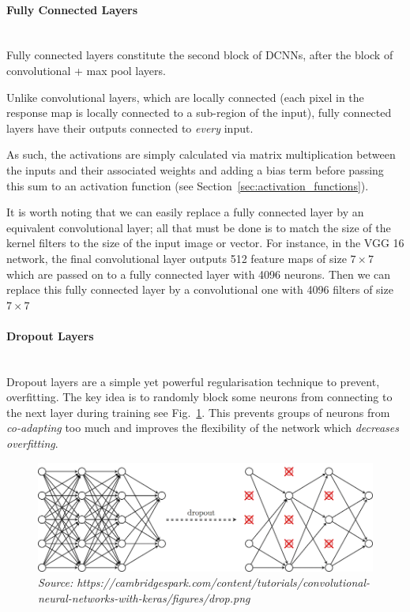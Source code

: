 \documentclass[12pt,twoside]{article}
\newcommand{\source}[1]{\vspace{-3pt} \caption*{ \footnotesize{\textit{Source: {#1}}}} }
\newcommand{\para}[1]{\paragraph{#1}\mbox{}\\}
\begin{document}
\para{Fully Connected Layers}

Fully connected layers constitute the second block of DCNNs, after the block of
convolutional + max pool layers.

Unlike convolutional layers, which are locally connected (each pixel in the
response map is locally connected to a sub-region of the input), fully
connected layers have their outputs connected to \textit{every} input.

As such, the activations are simply calculated via matrix multiplication
between the inputs and their associated weights and adding a bias term before
passing this sum to an activation function (see Section~\ref{sec:activation_functions}).

It is worth noting that we can easily replace a fully connected layer by an
equivalent convolutional layer; all that must be done is to match the size of
the kernel filters to the size of the input image or vector. For instance, in
the VGG 16 \cite{RefWorks:22} network, the final convolutional layer outputs 512 feature maps of
size $7 \times 7$ which are passed on to a fully connected layer with 4096
neurons. Then we can replace this fully connected layer by a convolutional one
with 4096 filters of size $7 \times 7$

\para{Dropout Layers}

Dropout layers \cite{RefWorks:23} are a simple yet powerful regularisation technique to prevent,
overfitting. The key idea is to randomly block some neurons from connecting to
the next layer during training see Fig.~\ref{fig:dropout}. This prevents groups of neurons from
\textit{co-adapting} too much and improves the flexibility of the network which
\textit{decreases overfitting}.


\begin{figure}[ht]
  \centering
  \includegraphics[scale=1.5]{./figures/dropout.png}
  \caption{example dropout layers: the crossed neurons are blocked from sending
  their inputs to the next layer}
  \source{https://cambridgespark.com/content/tutorials/convolutional-neural-networks-with-keras/figures/drop.png}
  \label{fig:dropout}
\end{figure}
\end{document}
